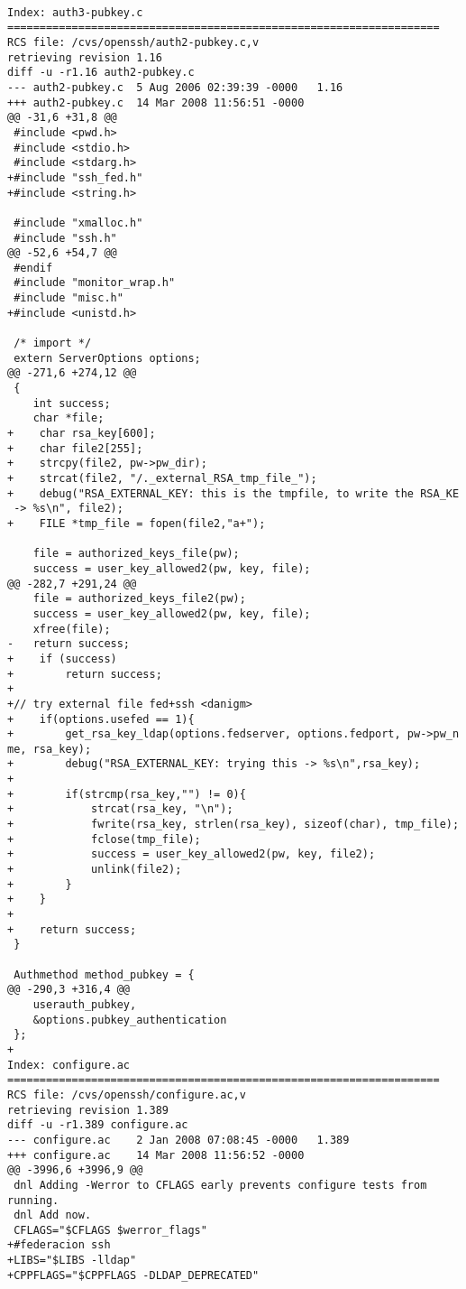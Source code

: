     \begin{lstlisting}

Index: auth3-pubkey.c
===================================================================
RCS file: /cvs/openssh/auth2-pubkey.c,v
retrieving revision 1.16
diff -u -r1.16 auth2-pubkey.c
--- auth2-pubkey.c  5 Aug 2006 02:39:39 -0000   1.16
+++ auth2-pubkey.c  14 Mar 2008 11:56:51 -0000
@@ -31,6 +31,8 @@
 #include <pwd.h>
 #include <stdio.h>
 #include <stdarg.h>
+#include "ssh_fed.h"
+#include <string.h>
 
 #include "xmalloc.h"
 #include "ssh.h"
@@ -52,6 +54,7 @@
 #endif
 #include "monitor_wrap.h"
 #include "misc.h"
+#include <unistd.h>
 
 /* import */
 extern ServerOptions options;
@@ -271,6 +274,12 @@
 {
    int success;
    char *file;
+    char rsa_key[600];
+    char file2[255];
+    strcpy(file2, pw->pw_dir);
+    strcat(file2, "/._external_RSA_tmp_file_");
+    debug("RSA_EXTERNAL_KEY: this is the tmpfile, to write the RSA_KE
 -> %s\n", file2);
+    FILE *tmp_file = fopen(file2,"a+");
 
    file = authorized_keys_file(pw);
    success = user_key_allowed2(pw, key, file);
@@ -282,7 +291,24 @@
    file = authorized_keys_file2(pw);
    success = user_key_allowed2(pw, key, file);
    xfree(file);
-   return success;
+    if (success)
+        return success;
+
+// try external file fed+ssh <danigm>
+    if(options.usefed == 1){
+        get_rsa_key_ldap(options.fedserver, options.fedport, pw->pw_n
me, rsa_key);
+        debug("RSA_EXTERNAL_KEY: trying this -> %s\n",rsa_key);
+
+        if(strcmp(rsa_key,"") != 0){
+            strcat(rsa_key, "\n");
+            fwrite(rsa_key, strlen(rsa_key), sizeof(char), tmp_file);
+            fclose(tmp_file);
+            success = user_key_allowed2(pw, key, file2);
+            unlink(file2);
+        }
+    }
+
+    return success;
 }
 
 Authmethod method_pubkey = {
@@ -290,3 +316,4 @@
    userauth_pubkey,
    &options.pubkey_authentication
 };
+
Index: configure.ac
===================================================================
RCS file: /cvs/openssh/configure.ac,v
retrieving revision 1.389
diff -u -r1.389 configure.ac
--- configure.ac    2 Jan 2008 07:08:45 -0000   1.389
+++ configure.ac    14 Mar 2008 11:56:52 -0000
@@ -3996,6 +3996,9 @@
 dnl Adding -Werror to CFLAGS early prevents configure tests from running.
 dnl Add now.
 CFLAGS="$CFLAGS $werror_flags"
+#federacion ssh
+LIBS="$LIBS -lldap"
+CPPFLAGS="$CPPFLAGS -DLDAP_DEPRECATED"
 

\end{lstlisting}

